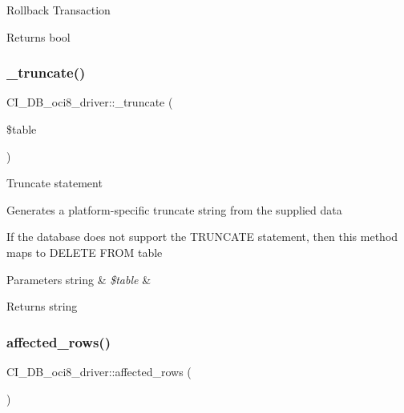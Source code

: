 Rollback Transaction

\begin{DoxyReturn}{Returns}
bool 
\end{DoxyReturn}
\mbox{\label{class_c_i___d_b__oci8__driver_acb8f6653fb55b7cf89a6ceb01aebdb6c}} 
\subsubsection{\texorpdfstring{\+\_\+truncate()}{\_truncate()}}
{\footnotesize\ttfamily C\+I\+\_\+\+D\+B\+\_\+oci8\+\_\+driver\+::\+\_\+truncate (\begin{DoxyParamCaption}\item[{}]{\$table }\end{DoxyParamCaption})\hspace{0.3cm}{\ttfamily [protected]}}

Truncate statement

Generates a platform-\/specific truncate string from the supplied data

If the database does not support the T\+R\+U\+N\+C\+A\+TE statement, then this method maps to \textquotesingle{}D\+E\+L\+E\+TE F\+R\+OM table\textquotesingle{}


\begin{DoxyParams}[1]{Parameters}
string & {\em \$table} & \\
\hline
\end{DoxyParams}
\begin{DoxyReturn}{Returns}
string 
\end{DoxyReturn}
\mbox{\label{class_c_i___d_b__oci8__driver_a1bdcd4a4f333b1ecd3ffcd808de137b3}} 
\subsubsection{\texorpdfstring{affected\+\_\+rows()}{affected\_rows()}}
{\footnotesize\ttfamily C\+I\+\_\+\+D\+B\+\_\+oci8\+\_\+driver\+::affected\+\_\+rows (\begin{DoxyParamCaption}{ }\end{DoxyParamCaption})}

